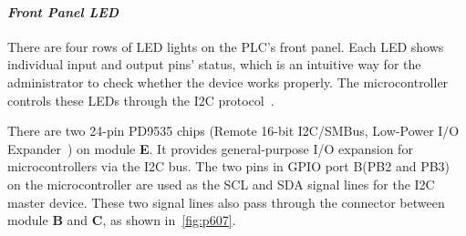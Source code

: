 \paragraph{\textbf{\textit{Front Panel LED}}} There are four rows of LED lights on the PLC's front panel. Each LED shows individual input and output pins' status, which is an intuitive way for the administrator to check whether the device works properly. The microcontroller controls these LEDs through the I2C protocol~\cite{semiconductors2000i2c}.

There are two 24-pin PD9535 chips (Remote 16-bit I2C/SMBus, Low-Power I/O Expander~\cite{pd9535}) on module \textbf{E}. It provides general-purpose I/O expansion for microcontrollers via the I2C bus. The two pins in GPIO port B(PB2 and PB3) on the microcontroller are used as the SCL and SDA signal lines for the I2C master device. These two signal lines also pass through the connector between module \textbf{B} and \textbf{C}, as shown in~\autoref{fig:p607}.



